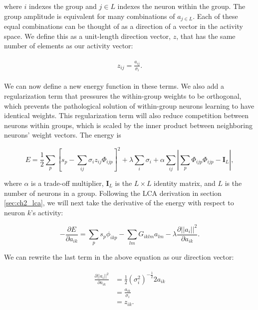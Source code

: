 \noindent where $i$ indexes the group and $j \in L$ indexes the neuron within the group. The group amplitude is equivalent for many combinations of $a_{j \in L}$. Each of these equal combinations can be thought of as a direction of a vector in the activity space. We define this as a unit-length direction vector, $z$, that has the same number of elements as our activity vector:

\begin{align}\label{eq:ch3_z_def}
\begin{split}
  z_{ij} = \frac{a_{ij}}{\sigma_{i}}.
\end{split}
\end{align}

We can now define a new energy function in these terms. We also add a regularization term that pressures the within-group weights to be orthogonal, which prevents the pathological solution of within-group neurons learning to have identical weights. This regularization term will also reduce competition between neurons within groups, which is scaled by the inner product between neighboring neurons' weight vectors. The energy is

\begin{equation}\label{eq:ch3_subspace_lca_energy}
    E = \frac{1}{2}\sum_{p}\left[s_{p} - \sum_{ij}\sigma_{i}z_{ij}\Phi_{ijp}\right]^{2} + \lambda \sum_{i}\sigma_{i} + \alpha \sum_{ij}\left|\sum_{p} \Phi_{ijp}\Phi_{ijp} - \mathbf{I}_{L} \right|,
\end{equation}

\noindent where $\alpha$ is a trade-off multiplier, $\mathbf{I}_{L}$ is the $L \times L$ identity matrix, and $L$ is the number of neurons in a group. Following the LCA derivation in section \ref{sec:ch2_lca}, we will next take the derivative of the energy with respect to neuron $k$'s activity:

\begin{equation}\label{eq:ch3_subspace_deda}
    -\frac{\partial E}{\partial a_{ik}} = \sum_{p}s_{p}\phi_{ikp} - \sum_{lm}G_{iklm}a_{lm} - \lambda \frac{\partial ||a_{i}||^{2}}{\partial a_{ik}}.
\end{equation}

We can rewrite the last term in the above equation as our direction vector:

\begin{align}\label{eq:ch3_subspace_deda_to_z}
\begin{split}
    \frac{\partial ||a_{i}||^{2}}{\partial a_{ik}} &= \frac{1}{2}\left(\sigma_{i}^{2}\right)^{-\tfrac{1}{2}}2a_{ik}\\
    &= \frac{a_{ik}}{\sigma_{i}}\\
    &= z_{ik}.
\end{split}
\end{align}

